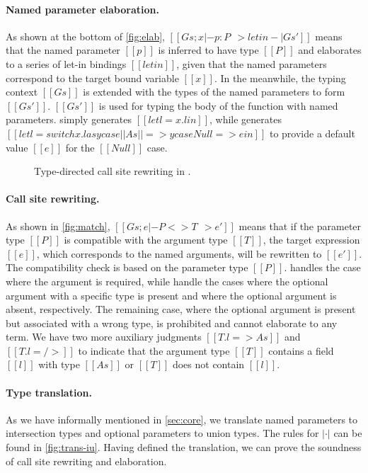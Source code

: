 \paragraph{Named parameter elaboration.}
As shown at the bottom of \autoref{fig:elab},
$[[Gs; x |- p : P ~~> letin -| Gs']]$ means that the named parameter
$[[p]]$ is inferred to have type $[[P]]$ and elaborates to a series of let-in
bindings $[[letin]]$, given that the named parameters correspond to the target
bound variable $[[x]]$. In the meanwhile, the typing context $[[Gs]]$ is extended
with the types of the named parameters to form $[[Gs']]$. $[[Gs']]$ is used for
typing the body of the function with named parameters. 
simply generates $[[let l = x.l in]]$, while  generates
$[[let l = switch x.l as y case ||As|| => y case Null => e in]]$ to provide a
default value $[[e]]$ for the $[[Null]]$ case.

\begin{figure}
\IUdefnpmatch{}
\IUdefnlookup{}
\IUdefnlookdown{}
\caption{Type-directed call site rewriting in \uaena.} \label{fig:match}
\end{figure}

\paragraph{Call site rewriting.}
As shown in \autoref{fig:match},
$[[Gs; e |- P <> T ~~> e']]$ means that if the parameter type
$[[P]]$ is compatible with the argument type $[[T]]$, the target expression
$[[e]]$, which corresponds to the named arguments, will be rewritten to
$[[e']]$. The compatibility check is based on the parameter type $[[P]]$.
 handles the case where the argument is required, while
 handle the cases where the optional argument
with a specific type is present and where the optional argument is absent,
respectively. The remaining case, where the optional argument is present but
associated with a wrong type, is prohibited and cannot elaborate to any term.
We have two more auxiliary judgments $[[T.l => As]]$ and
$[[T.l =/>]]$ to indicate that the argument type $[[T]]$ contains a field $[[l]]$
with type $[[As]]$ or $[[T]]$ does not contain $[[l]]$.

\paragraph{Type translation.}
As we have informally mentioned in \autoref{sec:core}, we translate named
parameters to intersection types and optional parameters to union types. The
rules for $|\cdot|$ can be found in \autoref{fig:trans-iu}. Having
defined the translation, we can prove the soundness of call site rewriting and
elaboration.

